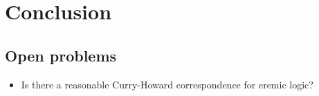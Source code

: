 \section{Conclusion}\label{conclusion}

\subsection{Open problems}

\begin{itemize}

\item Is there a reasonable Curry-Howard correspondence for eremic
  logic?

\end{itemize}
